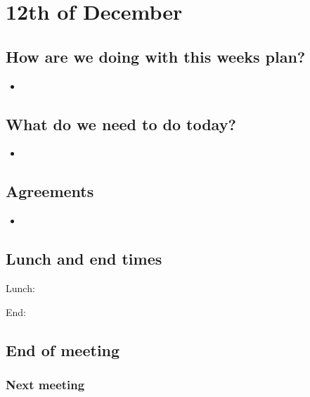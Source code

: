 \section{12th of December}
\subsection{How are we doing with this weeks plan?}
\begin{itemize}
\item 
\end{itemize}

\subsection{What do we need to do today?}
\begin{itemize}
\item 
\end{itemize}

\subsection{Agreements}
\begin{itemize}
\item 
\end{itemize}
\subsection{Lunch and end times}
Lunch:

End:

\subsection{End of meeting}
\subsubsection{Next meeting}
